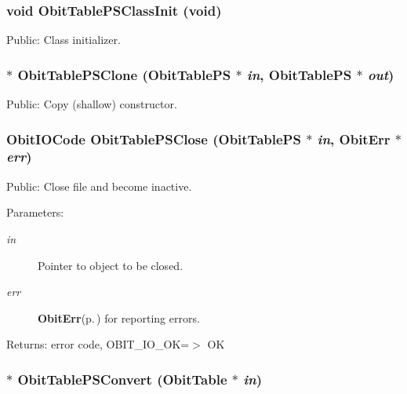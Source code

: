 \subsubsection{\setlength{\rightskip}{0pt plus 5cm}void Obit\-Table\-PSClass\-Init (void)}\label{ObitTablePS_8h_a10}


Public: Class initializer. 

\subsubsection{$\ast$ Obit\-Table\-PSClone ({\bf Obit\-Table\-PS} $\ast$ {\em in}, {\bf Obit\-Table\-PS} $\ast$ {\em out})}\label{ObitTablePS_8h_a15}


Public: Copy (shallow) constructor. 

\subsubsection{\setlength{\rightskip}{0pt plus 5cm}Obit\-IOCode Obit\-Table\-PSClose ({\bf Obit\-Table\-PS} $\ast$ {\em in}, {\bf Obit\-Err} $\ast$ {\em err})}\label{ObitTablePS_8h_a21}


Public: Close file and become inactive. 

\begin{Desc}
\item[Parameters:]
\begin{description}
\item[{\em in}]Pointer to object to be closed. \item[{\em err}]{\bf Obit\-Err}{\rm (p.\,\pageref{structObitErr})} for reporting errors. \end{description}
\end{Desc}
\begin{Desc}
\item[Returns:]error code, OBIT\_\-IO\_\-OK=$>$ OK \end{Desc}
\subsubsection{$\ast$ Obit\-Table\-PSConvert ({\bf Obit\-Table} $\ast$ {\em in})}\label{ObitTablePS_8h_a16}



